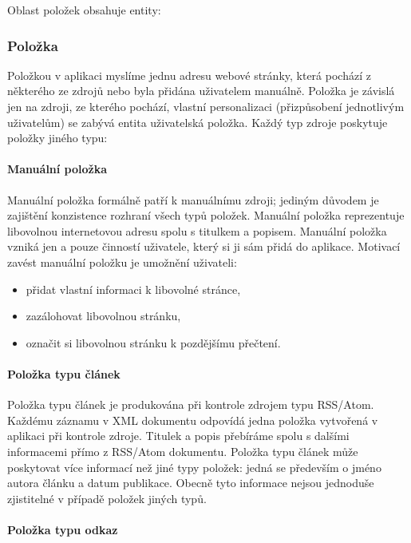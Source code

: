 Oblast položek obsahuje entity:

\subsubsection{Položka}

Položkou v aplikaci myslíme jednu adresu webové stránky, která pochází z některého ze zdrojů nebo byla přidána uživatelem manuálně.
Položka je závislá jen na zdroji, ze kterého pochází, vlastní personalizaci (přizpůsobení jednotlivým uživatelům) se zabývá entita uživatelská položka.
Každý typ zdroje poskytuje položky jiného typu:

\paragraph{Manuální položka}

Manuální položka formálně patří k manuálnímu zdroji; jediným důvodem je zajištění konzistence rozhraní všech typů položek.
Manuální položka reprezentuje libovolnou internetovou adresu spolu s titulkem a popisem.
Manuální položka vzniká jen a pouze činností uživatele, který si ji sám přidá do aplikace.
Motivací zavést manuální položku je umožnění uživateli:
\begin{itemize}
	\item přidat vlastní informaci k libovolné stránce,
	\item zazálohovat libovolnou stránku,
	\item označit si libovolnou stránku k pozdějšímu přečtení.
\end{itemize}

\paragraph{Položka typu článek}

Položka typu článek je produkována při kontrole zdrojem typu RSS/Atom.
Každému záznamu v XML dokumentu odpovídá jedna položka vytvořená v aplikaci při kontrole zdroje.
Titulek a popis přebíráme spolu s dalšími informacemi přímo z RSS/Atom dokumentu.
Položka typu článek může poskytovat více informací než jiné typy položek: jedná se především o jméno autora článku a datum publikace.
Obecně tyto informace nejsou jednoduše zjistitelné v případě položek jiných typů.

\paragraph{Položka typu odkaz}

